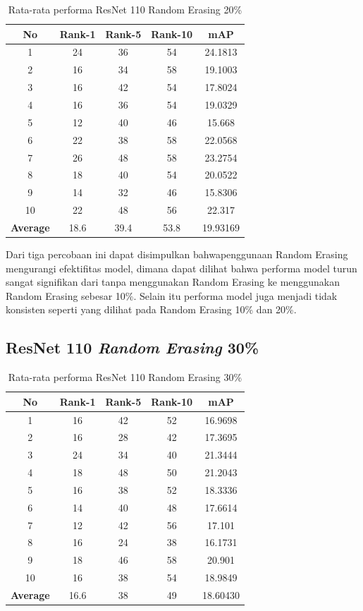 \begin{longtable}{|c|c|c|c|c|}
	\caption{Rata-rata performa ResNet 110 Random Erasing 20\%}
	\label{tabel: 32}\\
	\hline
	\rowcolor[HTML]{C0C0C0}
	\textbf{No} &\textbf{Rank-1} & \textbf{Rank-5} & \textbf{Rank-10} & \textbf{mAP} \\
	\hline
	1 &24 &36 &54 &24.1813 \\
	2 &16 &34 &58 &19.1003 \\
	3 &16 &42 &54 &17.8024 \\
	4 &16 &36 &54 &19.0329 \\
	5 &12 &40 &46 &15.668 \\
	6 &22 &38 &58 &22.0568 \\
	7 &26 &48 &58 &23.2754 \\
	8 &18 &40 &54 &20.0522 \\
	9 &14 &32 &46 &15.8306 \\
	10 &22 &48 &56 &22.317 \\
	\hline
	\textbf{Average} & 18.6 & 39.4 & 53.8 &19.93169 \\
	\hline
\end{longtable} 
Dari tiga percobaan ini dapat disimpulkan bahwapenggunaan Random Erasing mengurangi efektifitas model, dimana dapat dilihat bahwa performa model turun sangat signifikan dari tanpa menggunakan Random Erasing ke menggunakan Random Erasing sebesar 10\%. Selain itu performa model juga menjadi tidak konsisten seperti yang dilihat pada Random Erasing 10\% dan 20\%.

\subsection{ResNet 110 \textit{Random Erasing} 30\%}

\begin{longtable}{|c|c|c|c|c|}
	\caption{Rata-rata performa ResNet 110 Random Erasing 30\%}
	\label{tabel: 33}\\
	\hline
	\rowcolor[HTML]{C0C0C0}
	\textbf{No} &\textbf{Rank-1} & \textbf{Rank-5} & \textbf{Rank-10} & \textbf{mAP} \\
	\hline
	1 &16 &42 &52 &16.9698 \\
	2 &16 &28 &42 &17.3695 \\
	3 &24 &34 &40 &21.3444 \\
	4 &18 &48 &50 &21.2043 \\
	5 &16 &38 &52 &18.3336 \\
	6 &14 &40 &48 &17.6614 \\
	7 &12 &42 &56 &17.101 \\
	8 &16 &24 &38 &16.1731 \\
	9 &18 &46 &58 &20.901 \\
	10 &16 &38 &54 &18.9849 \\
	\hline
	\textbf{Average} & 16.6 & 38 & 49 &18.60430 \\
	\hline
\end{longtable}

